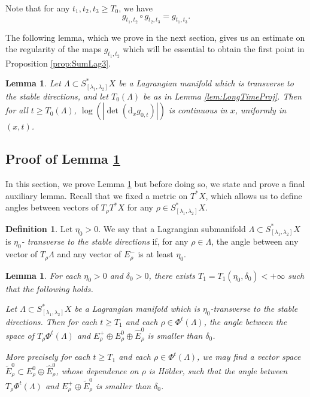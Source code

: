 \documentclass[JEP,XML,SOM,Unicode,published]{cedram}
\newcommand{\sd}{\mathrm{d}}
\theoremstyle{plain}
\newtheorem{lemma}[theorem]{Lemma}
\theoremstyle{definition}
\newtheorem{definition}[theorem]{Definition}
\begin{document}
Note that for any $t_1,t_2,t_3 \geq T_0$, we have
\begin{equation}\label{eq:Fonctorialite}
g_{t_1,t_2} \circ g_{t_2,t_3} = g_{t_1,t_3}.
\end{equation}

The following lemma, which we prove in the next section, gives us an estimate on the regularity of the maps $g_{t_1,t_2}$ which will be essential to obtain the first point in Proposition \ref{prop:SumLag3}.

\begin{lemma}\label{lem:LaBorneChiante}
Let $\Lambda\subset S_{[\lambda_1,\lambda_2]}^*X$ be a Lagrangian manifold which is transverse to the stable directions, and let $T_0(\Lambda)$ be as in Lemma \ref{lem:LongTimeProj}.
Then for all $t\geq T_0(\Lambda)$, $\log(|{\det}(\sd _x g_{0,t})|)$ is continuous in $x$, uniformly in $(x,t)$.
\end{lemma}

\subsection{Proof of Lemma \ref{lem:LaBorneChiante}}\label{ss:labornechiante}
In this section, we prove Lemma \ref{lem:LaBorneChiante} but before doing so, we state and prove a final auxiliary lemma. Recall that we fixed a metric on $T^*X$, which allows us to define angles between vectors of $T_\rho T^*X$ for any $\rho\in S_{[\lambda_1,\lambda_2]}^*X$.

\begin{definition}\label{def:EtaTransversalite}
Let $\eta_0>0$. We say that a Lagrangian submanifold $\Lambda\subset S_{[\lambda_1,\lambda_2]}^*X$ is \emph{$\eta_0$- transverse to the stable directions} if, for any $\rho\in \Lambda$, the angle between any vector of $T_\rho\Lambda$ and any vector of $E_\rho^-$ is at least $\eta_0$.
\end{definition}

\begin{lemma}\label{l:charts}
For each $\eta_0>0$ and $\delta_0>0$, there exists $T_1=T_1(\eta_0,\delta_0)<+\infty$ such that the following holds.

Let $\Lambda\subset S_{[\lambda_1,\lambda_2]}^*X$ be a Lagrangian manifold which is $\eta_0$-transverse to the stable directions. Then for each $t\geq T_1$ and each $\rho\in \Phi^t(\Lambda)$, the angle between the space of $T_\rho\Phi^t(\Lambda)$ and $E_\rho^+\oplus E_\rho^0\oplus \hat{E}_\rho^0$ is smaller than $\delta_0$.

More precisely for each $t\geq T_1$ and each $\rho\in \Phi^t(\Lambda)$, we may find a vector space $\tilde{E}^0_\rho \subset E_\rho^0\oplus \hat{E}_\rho^0$, whose dependence on $\rho$ is Hölder, such that
the angle between $T_\rho\Phi^t(\Lambda)$ and $E_\rho^+\oplus \tilde{E}_\rho^0$ is smaller than $\delta_0$.
\end{lemma}
\end{document}

